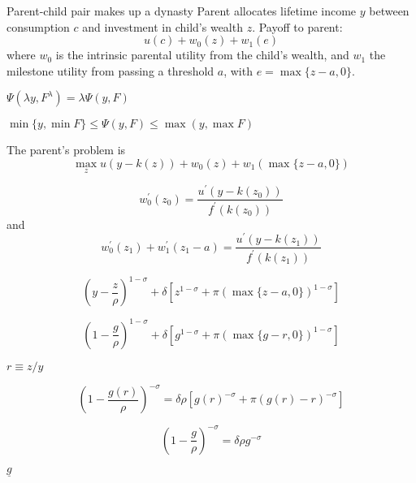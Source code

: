 \documentclass[11pt]{article}
\begin{document}
    
Parent-child pair makes up a dynasty
Parent allocates lifetime income \( y \) between consumption \( c \) and investment in child's wealth \( z \). 
Payoff to parent: 
\[u(c) + w_0(z) + w_1(e)\]
where \( w_0 \) is the intrinsic parental utility from the child's wealth, and \( w_1 \) the milestone utility from passing a threshold \( a \), with \( e = \max\{z - a, 0\} \). 

\( \Psi(\lambda y, F^\lambda) = \lambda\Psi(y, F) \)

\( \min\{y, \min F\} \leq \Psi(y, F) \leq \max(y, \max F) \)


The parent's problem is 
\[\max_z u(y - k(z)) + w_0(z) + w_1(\max\{z - a, 0\})\]

\[w_0^\prime(z_0) = \frac{u^\prime(y - k(z_0))}{f^\prime(k(z_0))}\]
and
\[w_0^\prime(z_1) + w_1^\prime(z_1 - a) = \frac{u^\prime(y - k(z_1))}{f^\prime(k(z_1))}\]


\[\left(y - \frac{z}{\rho}\right)^{1 - \sigma} + \delta\left[z^{1 - \sigma} + \pi \left(\max\{z - a, 0\}\right)^{1 - \sigma}\right]\]

\[\left(1 - \frac{g}{\rho}\right)^{1 - \sigma} + \delta\left[g^{1 - \sigma} + \pi \left(\max\{g - r, 0\}\right)^{1 - \sigma}\right]\]

$r\equiv z/y$ 

\[\left(1 - \frac{g(r)}{\rho}\right)^{- \sigma} = \delta\rho\left[g(r)^{- \sigma} + \pi \left(g(r) - r\right)^{-\sigma}\right]\]

\[\left(1 - \frac{g}{\rho}\right)^{-\sigma} = \delta\rho g^{-\sigma} \]

\( \underline{g} \)
\end{document}
